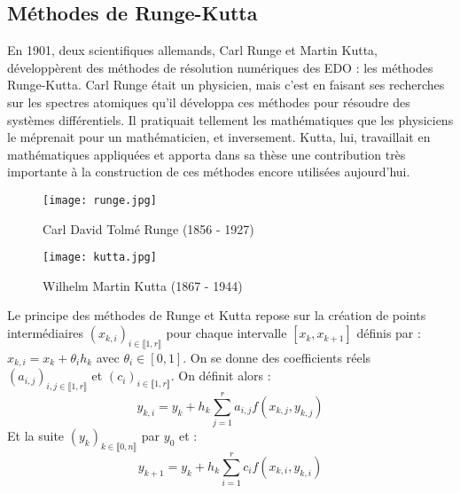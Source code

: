 \documentclass[a4paper, titlepage]{livret} %
\begin{document}
			\subsection{Méthodes de Runge-Kutta}
				En 1901, deux scientifiques allemands, Carl Runge et Martin Kutta, développèrent des méthodes de résolution numériques des EDO : les méthodes Runge-Kutta.
				Carl Runge était un physicien, mais c'est en faisant ses recherches sur les spectres atomiques qu'il développa ces méthodes pour résoudre des systèmes différentiels.
				Il pratiquait tellement les mathématiques que les physiciens le méprenait pour un mathématicien, et inversement.
				Kutta, lui, travaillait en mathématiques appliquées et apporta dans sa thèse une contribution très importante à la construction de ces méthodes encore utilisées aujourd'hui.
				\newpage
				\begin{figure}[!h]
 					\begin{minipage}[b]{.45\linewidth}
 						\centering
 							\texttt{[image: runge.jpg]}
 							\caption{Carl David Tolmé Runge (1856 - 1927)}
 					\end{minipage} \hfill
 					\begin{minipage}[b]{.45\linewidth}
 						\centering
 							\texttt{[image: kutta.jpg]}
 							\caption{Wilhelm Martin Kutta (1867 - 1944)}
 					\end{minipage}
				\end{figure}

				Le principe des méthodes de Runge et Kutta repose sur la création de points intermédiaires $(x_{k,i})_{i \in \llbracket 1, r \rrbracket}$ pour chaque intervalle $[x_{k}, x_{k+1}]$ définis par : $x_{k,i} = x_{k} + \theta_{i}h_{k}$ avec $\theta_{i} \in [0,1]$.
				On se donne des coefficients réels $(a_{i,j})_{i,j \in \llbracket 1, r \rrbracket}$ et $(c_{i})_{i \in \llbracket 1, r \rrbracket}$.
				On définit alors :
				\[
					y_{k,i} = y_{k} + h_{k}\sum_{j = 1}^{r} a_{i,j}f(x_{k,j},y_{k,j})
				\]
				Et la suite $(y_{k})_{k \in \llbracket 0, n \rrbracket}$ par $y_{0}$ et :
				\[
					y_{k+1} = y_{k} + h_{k}\sum_{i = 1}^{r} c_{i}f(x_{k,i},y_{k,i})
				\]
\end{document}
